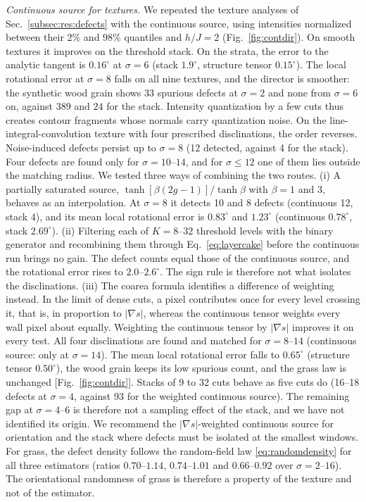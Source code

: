 \documentclass[11pt,a4paper]{article}
\begin{document}
\emph{Continuous source for textures.} We repeated the texture analyses of Sec.~\ref{subsec:res:defects} with the continuous source, using intensities normalized between their 2\% and 98\% quantiles and $h/J=2$ (Fig.~\ref{fig:contdir}). On smooth textures it improves on the threshold stack. On the strata, the error to the analytic tangent is $0.16^\circ$ at $\sigma=6$ (stack $1.9^\circ$, structure tensor $0.15^\circ$). The local rotational error at $\sigma=8$ falls on all nine textures, and the director is smoother: the synthetic wood grain shows $33$ spurious defects at $\sigma=2$ and none from $\sigma=6$ on, against $389$ and $24$ for the stack. Intensity quantization by a few cuts thus creates contour fragments whose normals carry quantization noise. On the line-integral-convolution texture with four prescribed disclinations, the order reverses. Noise-induced defects persist up to $\sigma=8$ (12 detected, against 4 for the stack). Four defects are found only for $\sigma=10$--$14$, and for $\sigma\le12$ one of them lies outside the matching radius. We tested three ways of combining the two routes. (i) A partially saturated source, $\tanh[\beta(2g-1)]/\tanh\beta$ with $\beta=1$ and $3$, behaves as an interpolation. At $\sigma=8$ it detects 10 and 8 defects (continuous 12, stack 4), and its mean local rotational error is $0.83^\circ$ and $1.23^\circ$ (continuous $0.78^\circ$, stack $2.69^\circ$). (ii) Filtering each of $K=8$--$32$ threshold levels with the binary generator and recombining them through Eq.~\eqref{eq:layercake} before the continuous run brings no gain. The defect counts equal those of the continuous source, and the rotational error rises to $2.0$--$2.6^\circ$. The sign rule is therefore not what isolates the disclinations. (iii) The coarea formula identifies a difference of weighting instead. In the limit of dense cuts, a pixel contributes once for every level crossing it, that is, in proportion to $|\nabla s|$, whereas the continuous tensor weights every wall pixel about equally. Weighting the continuous tensor by $|\nabla s|$ improves it on every test. All four disclinations are found and matched for $\sigma=8$--$14$ (continuous source: only at $\sigma=14$). The mean local rotational error falls to $0.65^\circ$ (structure tensor $0.50^\circ$), the wood grain keeps its low spurious count, and the grass law is unchanged [Fig.~\ref{fig:contdir}]. Stacks of 9 to 32 cuts behave as five cuts do (16--18 defects at $\sigma=4$, against 93 for the weighted continuous source). The remaining gap at $\sigma=4$--$6$ is therefore not a sampling effect of the stack, and we have not identified its origin. We recommend the $|\nabla s|$-weighted continuous source for orientation and the stack where defects must be isolated at the smallest windows. For grass, the defect density follows the random-field law \eqref{eq:randomdensity} for all three estimators (ratios $0.70$--$1.14$, $0.74$--$1.01$ and $0.66$--$0.92$ over $\sigma=2$--$16$). The orientational randomness of grass is therefore a property of the texture and not of the estimator.
\end{document}
